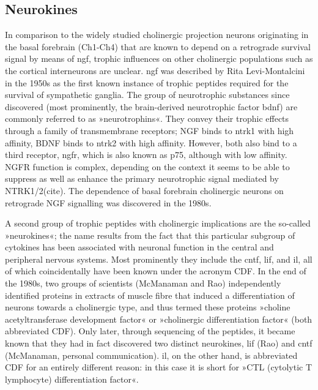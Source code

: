 \subsection{Neurokines} \label{sec:intro:neurokine}
In comparison to the widely studied cholinergic projection neurons originating in the basal forebrain (Ch1-Ch4) that are known to depend on a retrograde survival signal by means of \ac{ngf}, trophic influences on other cholinergic populations such as the cortical interneurons are unclear.  \ac{ngf} was described by Rita Levi-Montalcini in the 1950s as the first known instance of trophic peptides required for the survival of sympathetic ganglia\cite{Levi-Montalcini1960}. The group of neurotrophic substances since discovered (most prominently, the brain-derived neurotrophic factor \acs{bdnf}) are commonly referred to as »neurotrophins«. They convey their trophic effects through a family of transmembrane receptors; NGF binds to \ac{ntrk1} with high affinity, BDNF binds to \ac{ntrk2} with high affinity. However, both also bind to a third receptor, \ac{ngfr}, which is also known as p75, although with low affinity. NGFR function is complex, depending on the context it seems to be able to suppress as well as enhance the primary neurotrophic signal mediated by NTRK1/2(cite). The dependence of basal forebrain cholinergic neurons on retrograde NGF signalling was discovered in the 1980s\cite{Hefti1986}.  

A second group of trophic peptides with cholinergic implications are the so-called »neurokines«; the name results from the fact that this particular subgroup of cytokines has been associated with neuronal function in the central and peripheral nervous systems. Most prominently they include the \ac{cntf}, \ac{lif}, and \ac{il}, all of which coincidentally have been known under the acronym CDF. In the end of the 1980s, two groups of scientists (McManaman\cite{McManaman1988} and Rao\cite{Rao1992}) independently identified proteins in extracts of muscle fibre that induced a differentiation of neurons towards a cholinergic type, and thus termed these proteins »choline acetyltransferase development factor« or »cholinergic differentiation factor« (both abbreviated CDF). Only later, through sequencing of the peptides, it became known that they had in fact discovered two distinct neurokines, \ac{lif} (Rao) and \ac{cntf} (McManaman, personal communication). \ac{il}, on the other hand, is abbreviated CDF for an entirely different reason: in this case it is short for »CTL (cytolytic T lymphocyte) differentiation factor«.

